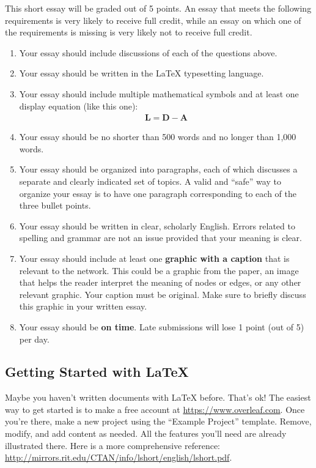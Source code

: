\documentclass{hw}
\begin{document}
This short essay will be graded out of 5 points. 
An essay that meets the following requirements is very likely to receive full credit, while an essay on which one of the requirements is missing is very likely not to receive full credit. 


\begin{enumerate}
    \item Your essay should include discussions of each of the questions above. 
    \item Your essay should be written in the \LaTeX{} typesetting language. 
    \item Your essay should include multiple mathematical symbols and at least one display equation (like this one):
    \begin{align}
        \mathbf{L} = \mathbf{D} - \mathbf{A}
    \end{align}
    \item Your essay should be no shorter than 500 words and no longer than 1,000 words.
    \item Your essay should be organized into paragraphs, each of which discusses a separate and clearly indicated set of topics. 
    A valid and ``safe'' way to organize your essay is to have one paragraph corresponding to each of the three bullet points. 
    \item Your essay should be written in clear, scholarly English. Errors related to spelling and grammar are not an issue provided that your meaning is clear. 
    \item Your essay should include at least one \textbf{graphic with a caption} that is relevant to the network. 
    This could be a graphic from the paper, an image that helps the reader interpret the meaning of nodes or edges, or any other relevant graphic.
    Your caption must be original.  
    Make sure to briefly discuss this graphic in your written essay. 
    \item Your essay should be \textbf{on time}. 
    Late submissions will lose 1 point (out of 5) per day. 
\end{enumerate}


\subsection*{Getting Started with \LaTeX}

Maybe you haven't written documents with \LaTeX{} before. 
That's ok! 
The easiest way to get started is to make a free account at \url{https://www.overleaf.com}. 
Once you're there, make a new project using the ``Example Project'' template. 
Remove, modify, and add content as needed. 
All the features you'll need are already illustrated there. 
Here is a more comprehensive reference: 
\url{http://mirrors.rit.edu/CTAN/info/lshort/english/lshort.pdf}. 
\end{document}
